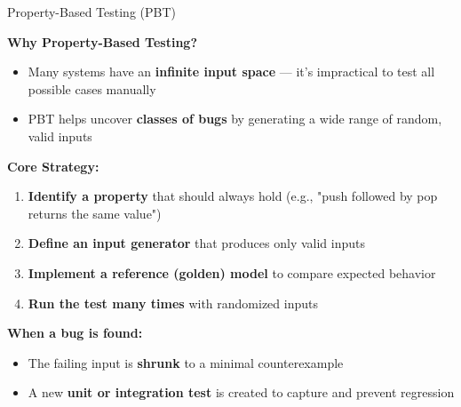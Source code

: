 \begin{frame}{Property-Based Testing (PBT)}
	
	\textbf{Why Property-Based Testing?}
	\begin{itemize}
		\item Many systems have an \textbf{infinite input space} — it's impractical to test all possible cases manually
		\item PBT helps uncover \textbf{classes of bugs} by generating a wide range of random, valid inputs
	\end{itemize}
	\pause
	\vspace{1em}
	\textbf{Core Strategy:}
	\begin{enumerate}
		\item \textbf{Identify a property} that should always hold (e.g., "push followed by pop returns the same value")
		\item \textbf{Define an input generator} that produces only valid inputs
		\item \textbf{Implement a reference (golden) model} to compare expected behavior
		\item \textbf{Run the test many times} with randomized inputs
	\end{enumerate}
	\pause
	\vspace{1em}
	\textbf{When a bug is found:}
	\begin{itemize}
		\item The failing input is \textbf{shrunk} to a minimal counterexample
		\item A new \textbf{unit or integration test} is created to capture and prevent regression
	\end{itemize}
	
\end{frame}

